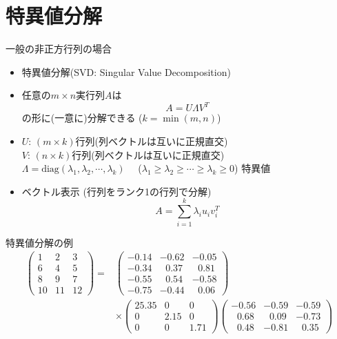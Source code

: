 \section{特異値分解}

\begin{frame}[t,fragile]{一般の非正方行列の場合}
  \begin{itemize}
  \item 特異値分解(SVD: Singular Value Decomposition)
  \item 任意の$m \times n$実行列$A$は
    \[
    A = U \Lambda V^T
    \]
    の形に(一意に)分解できる ($k=\min(m,n)$)
  \item $U$: $(m \times k)$行列(列ベクトルは互いに正規直交) \\
    $V$: $(n \times k)$行列(列ベクトルは互いに正規直交) \\
    $\Lambda = \text{diag}(\lambda_1,\lambda_2,\cdots,\lambda_k)$ \ \ ($\lambda_1\ge\lambda_2\ge\cdots\ge\lambda_k\ge 0$) 特異値
  \item ベクトル表示 (行列をランク1の行列で分解)
    \[
    A = \sum_{i=1}^k \lambda_i u_i v_i^{T}
    \]
  \end{itemize}
\end{frame}

\begin{frame}[t,fragile]{特異値分解の例}
  \[
  \begin{split}
    \begin{pmatrix}
      1 & 2 & 3 \\
      6 & 4 & 5 \\
      8 & 9 & 7 \\
      10 & 11 & 12
    \end{pmatrix} =&
    \begin{pmatrix}
      -0.14 & -0.62 & -0.05 \\
      -0.34 & \ \ \,0.37 & \ \ \,0.81 \\
      -0.55 & \ \ \,0.54 & -0.58 \\
      -0.75 & -0.44 & \ \ \,0.06      
    \end{pmatrix} \\
    &\times
    \begin{pmatrix}
      25.35 & 0 & 0 \\
      0 & 2.15 & 0 \\
      0 & 0 & 1.71
    \end{pmatrix}
    \begin{pmatrix}
      -0.56 & -0.59 & -0.59 \\
      \ \ \,0.68 & \ \ \,0.09 & -0.73 \\
      \ \ \,0.48 & -0.81 & \ \ \,0.35
    \end{pmatrix}
  \end{split}
  \]
\end{frame}

